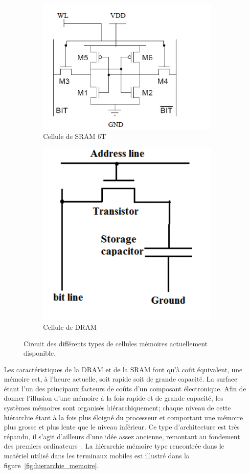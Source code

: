 \begin{figure}[!h]
	\centering
	\begin{subfigure}[b]{0,5\textwidth}
		\centering
		\includegraphics[width=\linewidth]{graphics/figures/6T-SRAM-Cell-III-PROPOSED-EIGHT-TRANSISTOR-8T-SRAM-CELL-In-this-proposed-SRAM-Dual}
		\caption{\label{fig:sram_cell} Cellule de SRAM 6T}
	\end{subfigure}
	\begin{subfigure}[b]{0,3\textwidth}
		\centering
		\includegraphics[width=0.5\linewidth]{graphics/figures/dram_cell}
		\caption{\label{fig:sram_cell} Cellule de DRAM}
	\end{subfigure}
	\caption{\label{fig:memoire_statique_dynamique} Circuit des différents types de cellules mémoires actuellement disponible.}
\end{figure}

Les caractéristiques de la DRAM et de la SRAM font qu'à coût équivalent, une mémoire est, à l'heure actuelle,  soit rapide soit de grande capacité.
La surface étant l'un des principaux facteurs de coûts d'un composant électronique.
Afin de donner l'illusion d'une mémoire à la fois rapide et de grande capacité, les systèmes mémoires sont organisés hiérarchiquement; chaque niveau de cette hiérarchie étant à la fois plus éloigné du processeur et comportant une mémoire plus grosse et plus lente que le niveau inférieur.
Ce type d'architecture est très répandu, il s'agit d'ailleurs d'une idée assez ancienne, remontant au fondement des premiers ordinateurs~\cite{von1946preliminary}.
La hiérarchie mémoire type rencontrée dans le matériel utilisé dans les terminaux mobiles est illustré dans la figure~\ref{fig:hierarchie_memoire}.

